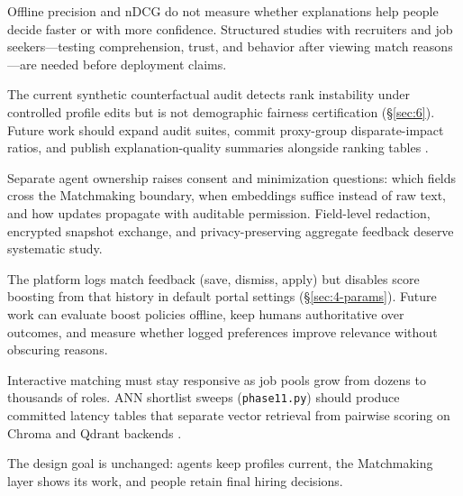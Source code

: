 Offline precision and nDCG do not measure whether explanations help people decide faster or with more confidence.
Structured studies with recruiters and job seekers---testing comprehension, trust, and behavior after viewing match reasons---are needed before deployment claims.

The current synthetic counterfactual audit detects rank instability under controlled profile edits but is not demographic fairness certification (\S\ref{sec:6}).
Future work should expand audit suites, commit proxy-group disparate-impact ratios, and publish explanation-quality summaries alongside ranking tables .

Separate agent ownership raises consent and minimization questions: which fields cross the Matchmaking boundary, when embeddings suffice instead of raw text, and how updates propagate with auditable permission.
Field-level redaction, encrypted snapshot exchange, and privacy-preserving aggregate feedback deserve systematic study.

The platform logs match feedback (save, dismiss, apply) but disables score boosting from that history in default portal settings (\S\ref{sec:4-params}).
Future work can evaluate boost policies offline, keep humans authoritative over outcomes, and measure whether logged preferences improve relevance without obscuring reasons.

Interactive matching must stay responsive as job pools grow from dozens to thousands of roles.
ANN shortlist sweeps (\texttt{phase11.py}) should produce committed latency tables that separate vector retrieval from pairwise scoring on Chroma and Qdrant backends .

The design goal is unchanged: agents keep profiles current, the Matchmaking layer shows its work, and people retain final hiring decisions.
